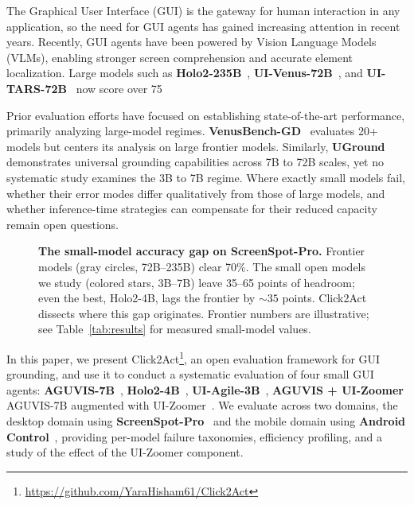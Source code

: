 \documentclass{article}
\theoremstyle{plain}
\theoremstyle{definition}
\theoremstyle{remark}
\begin{document}
The Graphical User Interface (GUI) is the gateway for human interaction in any application, so the need for GUI agents has gained increasing attention in recent years. Recently, GUI agents have been powered by Vision Language Models (VLMs), enabling stronger screen comprehension and accurate element localization. Large models such as \textbf{Holo2-235B}~\cite{holo2}, \textbf{UI-Venus-72B}~\cite{uivenus15}, and \textbf{UI-TARS-72B}~\cite{qin2025ui} now score over 75%

Prior evaluation efforts have focused on establishing state-of-the-art performance, primarily analyzing large-model regimes. \textbf{VenusBench-GD}~\cite{zhou2025venusbenchgdcomprehensivemultiplatformgui} evaluates 20+ models but centers its analysis on large frontier models. Similarly, \textbf{UGround}~\cite{gou2024uground} demonstrates universal grounding capabilities across 7B to 72B scales, yet no systematic study examines the 3B to 7B regime. Where exactly small models fail, whether their error modes differ qualitatively from those of large models, and whether inference-time strategies can compensate for their reduced capacity remain open questions. \par
\begin{figure}[t]
    \centering
    
    \caption{%
        \textbf{The small-model accuracy gap on ScreenSpot-Pro.}
        Frontier models (gray circles, 72B--235B) clear 70\%. The small open models we study (colored stars, 3B--7B) leave 35--65 points of headroom; even the best, Holo2-4B, lags the frontier by ${\sim}35$ points. Click2Act dissects where this gap originates. Frontier numbers are illustrative; see Table~\ref{tab:results} for measured small-model values.
    }
    \label{fig:teaser}
    \vspace{-1em}
\end{figure}

In this paper, we present Click2Act\footnote{\url{https://github.com/YaraHisham61/Click2Act}}, an open evaluation framework for GUI grounding, and use it to conduct a systematic evaluation of four small GUI agents: \textbf{AGUVIS-7B}~\cite{aguvis}, \textbf{Holo2-4B}~\cite{holo2}, \textbf{UI-Agile-3B}~\cite{uiagile}, \textbf{AGUVIS + UI-Zoomer} AGUVIS-7B augmented with UI-Zoomer~\cite{uizoomer}. We evaluate across two domains, the desktop domain using \textbf{ScreenSpot-Pro}~\cite{li2025screenspotpro} and the mobile domain using \textbf{Android Control}~\cite{androidcontrol}, providing per-model failure taxonomies, efficiency profiling, and a study of the effect of the UI-Zoomer component.\par
\end{document}
